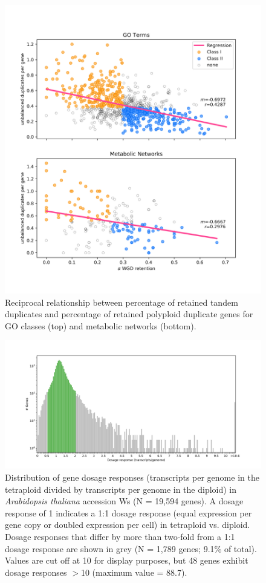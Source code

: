 \documentclass[11pt]{article}
\begin{document}
{\selectfont

\begin{figure}[h!]
    \includegraphics[width=\linewidth]{../figures/FIG1.png}
 \caption{Reciprocal relationship between percentage of retained tandem duplicates and percentage of retained polyploid duplicate genes for GO classes (top) and metabolic networks (bottom).}
  \label{fig1}
\end{figure}



\begin{figure}[h!]
   \includegraphics[width=\linewidth]{../figures/dr_frequency_bar.png}
\caption{Distribution of gene dosage responses (transcripts per genome in the tetraploid divided by transcripts per genome in the diploid) in \textit{Arabidopsis thaliana} accession Ws (N = 19,594 genes). A dosage response of 1 indicates a 1:1 dosage response (equal expression per gene copy or doubled expression per cell) in tetraploid vs. diploid. Dosage responses that differ by more than two-fold from a 1:1 dosage response are shown in grey (N = 1,789 genes; 9.1\% of total). Values are cut off at 10 for display purposes, but 48 genes exhibit dosage responses $>$10 (maximum value = 88.7).}
 \label{fig2}
\end{figure}


}
\end{document}
